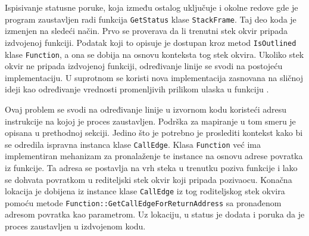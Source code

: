 \documentclass[12pt,oneside]{memoir}
\begin{document}
Ispisivanje statusne poruke, koja između ostalog uključuje i okolne redove gde je program zaustavljen radi funkcija \verb|GetStatus| klase \verb|StackFrame|.
Taj deo koda je izmenjen na sledeći način.
Prvo se proverava da li trenutni stek okvir pripada izdvojenoj funkciji.
Podatak koji to opisuje je dostupan kroz metod \verb|IsOutlined| klase \verb|Function|, a ona se dobija na osnovu konteksta tog stek okvira.
Ukoliko stek okvir ne pripada izdvojenoj funkciji, određivanje linije se svodi na postojeću implementaciju.
U suprotnom se koristi nova implementacija zasnovana na sličnoj ideji kao određivanje vrednosti promenljivih prilikom ulaska u funkciju \cite{sowda2019entryvalues}.

Ovaj problem se svodi na određivanje linije u izvornom kodu koristeći adresu instrukcije na kojoj je proces zaustavljen.
Podrška za mapiranje u tom smeru je opisana u prethodnoj sekciji.
Jedino što je potrebno je proslediti kontekst kako bi se odredila ispravna instanca klase \verb|CallEdge|.
Klasa \verb|Function| već ima implementiran mehanizam za pronalaženje te instance na osnovu adrese povratka iz funkcije.
Ta adresa se postavlja na vrh steka u trenutku poziva funkcije i lako se dohvata povratkom u rediteljski stek okvir koji pripada pozivaocu.
Konačna lokacija je dobijena iz instance klase \verb|CallEdge| iz tog roditeljskog stek okvira pomoću metode \verb|Function::GetCallEdgeForReturnAddress| sa pronađenom adresom povratka kao parametrom.  
Uz lokaciju, u status je dodata i poruka da je proces zaustavljen u izdvojenom kodu.
\end{document}
